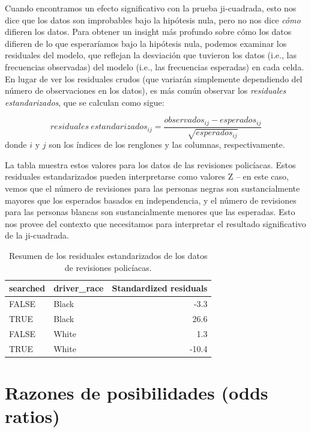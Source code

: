 \documentclass[
  12pt,
]{book}
\begin{document}
Cuando encontramos un efecto significativo con la prueba ji-cuadrada, esto nos dice que los datos son improbables bajo la hipótesis nula, pero no nos dice \emph{cómo} difieren los datos. Para obtener un insight más profundo sobre cómo los datos difieren de lo que esperaríamos bajo la hipótesis nula, podemos examinar los residuales del modelo, que reflejan la desviación que tuvieron los datos (i.e., las frecuencias observadas) del modelo (i.e., las frecuencias esperadas) en cada celda. En lugar de ver los residuales crudos (que variarán simplemente dependiendo del número de observaciones en los datos), es más común observar los \emph{residuales estandarizados}, que se calculan como sigue:

\[
residuales\ estandarizados_{ij} = \frac{observados_{ij} - esperados_{ij}}{\sqrt{esperados_{ij}}}
\]
donde \(i\) y \(j\) son los índices de los renglones y las columnas, respectivamente.

La tabla muestra estos valores para los datos de las revisiones policíacas. Estos residuales estandarizados pueden interpretarse como valores Z -- en este caso, vemos que el número de revisiones para las personas negras son sustancialmente mayores que los esperados basados en independencia, y el número de revisiones para las personas blancas son sustancialmente menores que las esperadas. Esto nos provee del contexto que necesitamos para interpretar el resultado significativo de la ji-cuadrada.

\begin{table}

\caption{\label{tab:unnamed-chunk-79}Resumen de los residuales estandarizados de los datos de revisiones policíacas.}
\centering
\begin{tabular}[t]{l|l|r}
\hline
searched & driver\_race & Standardized residuals\\
\hline
FALSE & Black & -3.3\\
\hline
TRUE & Black & 26.6\\
\hline
FALSE & White & 1.3\\
\hline
TRUE & White & -10.4\\
\hline
\end{tabular}
\end{table}

\hypertarget{razones-de-posibilidades-odds-ratios}{%
\section{Razones de posibilidades (odds ratios)}\label{razones-de-posibilidades-odds-ratios}}
\end{document}
